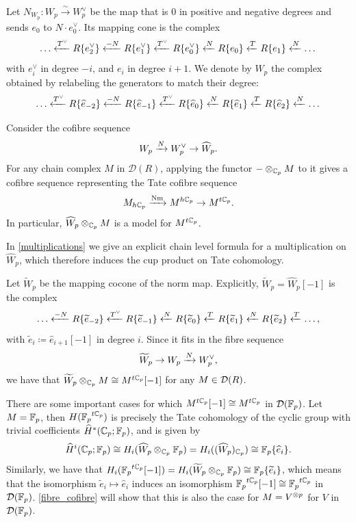 Let \(N_{W_p} \colon W_p \xrightarrow{\sim} W^\vee_p\) be the map that is \(0\) in positive and negative degrees and sends \(e_0\) to \(N \cdot e_0^\vee\).
Its mapping cone is the complex
\[
\dots \xleftarrow{T^\vee} R\{e_2^\vee\} \xleftarrow{-N} R\{e_1^\vee\} \xleftarrow{T^\vee} R\{e_0^\vee\} \xleftarrow{N} R\{e_0\} \xleftarrow{T} R\{e_1\} \xleftarrow{N} \dots
\]
with \(e_i^\vee\) in degree \(-i\), and \(e_i\) in degree \(i+1\).
We denote by \(\widehat W_p\) the complex obtained by relabeling the generators to match their degree:
\[
\dots \xleftarrow{T^\vee} R\{\widehat e_{-2}\} \xleftarrow{-N} R\{\widehat e_{-1}\} \xleftarrow{T^\vee} R\{\widehat e_0\} \xleftarrow{N} R\{\widehat e_1\} \xleftarrow{T} R\{\widehat e_2\} \xleftarrow{N} \dots
\]

Consider the cofibre sequence
\[
W_p \xrightarrow{N} W^\vee_p \to \widehat W_p.
\]
For any chain complex \(M\) in \(\mathcal D(R)\), applying the functor \(- \otimes_{\mathbb{C}_p} M\) to it gives a cofibre sequence representing the Tate cofibre sequence
\[
M_{h\mathbb{C}_p} \xrightarrow{\mathrm{Nm}} M^{h\mathbb{C}_p} \to M^{t\mathbb{C}_p}.
\]
In particular, \(\widehat W_p \otimes_{\mathbb{C}_p} M\) is a model for \(M^{t\mathbb{C}_p}\).

\begin{remark}
	In \cref{multiplications} we give an explicit chain level formula for a multiplication on \(\widehat W_p\), which therefore induces the cup product on Tate cohomology. %
\end{remark}

Let \(\widetilde W_p\) be the mapping cocone of the norm map.
Explicitly, \(\widetilde W_p = \widehat W_p[-1]\) is the complex
\[
\dots \xleftarrow{-N} R\{\widetilde e_{-2}\} \xleftarrow{T^\vee} R\{\widetilde e_{-1}\} \xleftarrow{N} R\{\widetilde e_0\} \xleftarrow{T} R\{\widetilde e_1\} \xleftarrow{N} R\{\widetilde e_2\} \xleftarrow{T} \dots,
\]
with \(\widetilde e_i \coloneqq \widehat e_{i+1}[-1]\) in degree \(i\).
Since it fits in the fibre sequence
\[
\widetilde W_p \to W_p \xrightarrow{N} W^\vee_p,
\]
we have that \(\widetilde W_p \otimes_{\mathbb{C}_p} M \cong M^{t\mathbb{C}_p}[-1]\) for any \(M \in \mathcal{D}(R)\).

\begin{remark}
	There are some important cases for which \(M^{t\mathbb{C}_p}[-1] \cong M^{t\mathbb{C}_p}\) in \(\mathcal{D}({\mathbb{F}_p})\).
	Let \(M = {\mathbb{F}_p}\), then \(H({\mathbb{F}_p}^{t\mathbb{C}_p})\) is precisely the Tate cohomology of the cyclic group with trivial coefficients \(\widehat H^*(\mathbb{C}_p;{\mathbb{F}_p})\), and is given by
	\[
	\widehat H^i(\mathbb{C}_p;{\mathbb{F}_p}) \cong H_i(\widehat W_p \otimes_{\mathbb{C}_p} {\mathbb{F}_p}) = H_i((\widehat W_p)_{\mathbb{C}_p}) \cong {\mathbb{F}_p}\{\widehat e_i\}.
	\]
	Similarly, we have that \(H_i({\mathbb{F}_p}^{t\mathbb{C}_p}[-1]) = H_i(\widetilde W_p \otimes_{\mathbb{C}_p} {\mathbb{F}_p}) \cong {\mathbb{F}_p}\{\widetilde e_i\}\), which means that the isomorphism \(\widetilde e_i \mapsto \widehat e_i\) induces an isomorphism \({\mathbb{F}_p}^{t\mathbb{C}_p}[-1] \cong {\mathbb{F}_p}^{t\mathbb{C}_p}\) in \(\mathcal{D}({\mathbb{F}_p})\).
	\cref{fibre_cofibre} will show that this is also the case for \(M = V^{\otimes p}\) for \(V\) in \(\mathcal{D}({\mathbb{F}_p})\). 
\end{remark}

